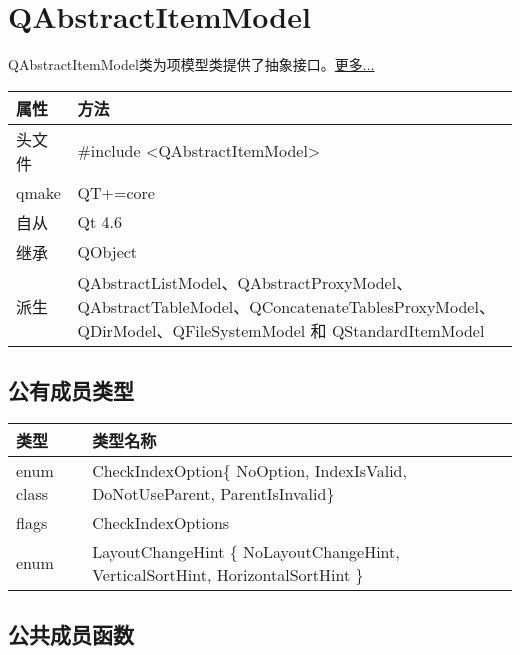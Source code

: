 \chapter{QAbstractItemModel}

QAbstractItemModel类为项模型类提供了抽象接口。\href{https://github.com/JackLovel/QtDocumentCN/blob/master/Src/A/QAbstractItemModel}{更多...} 

\setlength\extrarowheight{2pt}
\begin{tabular}{|m{5em}|m{25em}|}
	\hline
	属性 & 方法 \\
	\hline
	头文件 & \#include <QAbstractItemModel>\\      
	\hline
	qmake & QT+=core\\      
	\hline
	自从 & Qt 4.6\\
	\hline
	继承&QObject \\
	\hline
	派生 & QAbstractListModel、QAbstractProxyModel、
           QAbstractTableModel、QConcatenateTablesProxyModel、QDirModel、QFileSystemModel 和 QStandardItemModel \\
	\hline
\end{tabular}

\splitLine

\section{公有成员类型}

\begin{tabular}{|m{10em}|m{30em}|}
	\hline
	类型 & 类型名称 \\
	\hline
enum class&	CheckIndexOption\{ NoOption, IndexIsValid,
  DoNotUseParent, ParentIsInvalid\}\\
\hline
flags&	CheckIndexOptions\\
\hline
enum&	LayoutChangeHint \{ NoLayoutChangeHint, VerticalSortHint, HorizontalSortHint \}\\
\hline
\end{tabular}


\splitLine

\section{公共成员函数}

